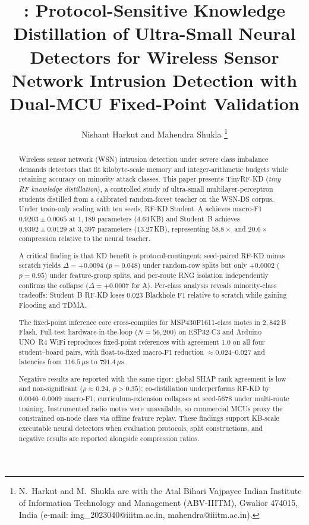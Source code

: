 \documentclass[journal]{IEEEtran}
\title{\method{}: Protocol-Sensitive Knowledge Distillation of Ultra-Small Neural Detectors for Wireless Sensor Network Intrusion Detection with Dual-MCU Fixed-Point Validation}
\author{Nishant Harkut and Mahendra Shukla%
\thanks{N.~Harkut and M.~Shukla are with the Atal Bihari Vajpayee Indian Institute of Information Technology and Management (ABV-IIITM), Gwalior 474015, India (e-mail: img\_2023040@iiitm.ac.in, mahendra@iiitm.ac.in).}}
\newcommand{\method}{TinyRF-KD}
\newcommand{\dataset}{WSN-DS}
\begin{document}
\maketitle

\begin{abstract}
Wireless sensor network (WSN) intrusion detection under severe class imbalance demands detectors that fit kilobyte-scale memory and integer-arithmetic budgets while retaining accuracy on minority attack classes.
This paper presents \method{} (\emph{tiny RF knowledge distillation}), a controlled study of ultra-small multilayer-perceptron students distilled from a calibrated random-forest teacher on the \dataset{} corpus.
Under train-only scaling with ten seeds, RF-KD Student~A achieves macro-F1 $0.9203 \pm 0.0065$ at $1{,}189$ parameters ($4.64$\,KB) and Student~B achieves $0.9392 \pm 0.0129$ at $3{,}397$ parameters ($13.27$\,KB), representing $58.8\times$ and $20.6\times$ compression relative to the neural teacher.

A critical finding is that KD benefit is protocol-contingent: seed-paired RF-KD minus scratch yields $\Delta = +0.0094$ ($p = 0.048$) under random-row splits but only $+0.0002$ ($p = 0.95$) under feature-group splits, and per-route RNG isolation independently confirms the collapse ($\Delta = +0.0007$ for A).
Per-class analysis reveals minority-class tradeoffs: Student~B RF-KD loses $0.023$ Blackhole F1 relative to scratch while gaining Flooding and TDMA.

The fixed-point inference core cross-compiles for MSP430F1611-class motes in $2{,}842$\,B Flash.
Full-test hardware-in-the-loop ($N = 56{,}200$) on ESP32-C3 and Arduino UNO~R4 WiFi reproduces fixed-point references with agreement $1.0$ on all four student--board pairs, with float-to-fixed macro-F1 reduction $\approx 0.024$--$0.027$ and latencies from $116.5$\,$\mu$s to $791.4$\,$\mu$s.

Negative results are reported with the same rigor: global SHAP rank agreement is low and non-significant ($\rho \approx 0.24$, $p > 0.35$); co-distillation underperforms RF-KD by $0.0046$--$0.0069$ macro-F1; curriculum-extension collapses at seed-$5678$ under multi-route training.
Instrumented radio motes were unavailable, so commercial MCUs proxy the constrained on-node class via offline feature replay.
These findings support KB-scale executable neural detectors when evaluation protocols, split constructions, and negative results are reported alongside compression ratios.
\end{abstract}
\end{document}
